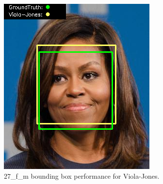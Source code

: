 \documentclass{l4proj}
\begin{document}
\begin{appendices}
\begin{figure}[h!]
\begin{minipage}{0.49\textwidth}
     \includegraphics[width=\textwidth]{images/appendix/viola/27.png}
    \caption{27\_f\_m bounding box performance for Viola-Jones.}
    \label{whoopi_result}
  \end{minipage}
\end{figure}


\end{appendices}
\end{document}
